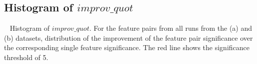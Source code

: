 \subsection{Histogram of $improv\_quot$}~\label{appF_exp_hist}
Histogram of $improv\_quot$. For the \toptwenty feature pairs from all runs from the (a) \msig and (b) \lincs datasets, distribution of the improvement of the feature pair significance over the corresponding single feature significance. The red line shows the significance threshold of 5.
\begin{figure}[!htb]
\centering %
\vspace{-5mm}
\vspace{-3mm}
\label{fig:histogram_diff}
\end{figure}
